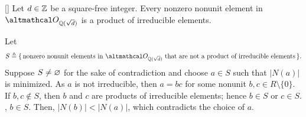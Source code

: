 \documentclass[../modern_algebra_2.tex]{subfiles}
\begin{document}

\begin{Theorem}{}[]
    Let \(d \in \ZZ\) be a square-free integer.
    Every nonzero nonunit element in \(\rqi{\sqrt{d}}\) is a product of irreducible elements.
\end{Theorem}
\begin{myproof}[Proof]
    Let
    \[
        S \triangleq \{\,\text{nonzero nonunit elements in }\rqi{\sqrt{d}}\text{ that are not a
        product of irreducible elements}\,\}\text{.}
    \]
    Suppose \(S \neq \varnothing\) for the sake of contradiction and choose \(a \in S\) such that \(|N(a)|\)
    is minimized.
    As \(a\) is not irreducible, then \(a = bc\) for some nonunit \(b, c \in R \setminus \{0\}\).
    If \(b, c \notin S\), then \(b\) and \(c\) are products of irreducible elements;
    hence \(b \in S\) or \(c \in S\). \WLOG, \(b \in S\). Then, \(|N(b)| < |N(a)|\),
    which contradicts the choice of \(a\).
\end{myproof}
\end{document}
